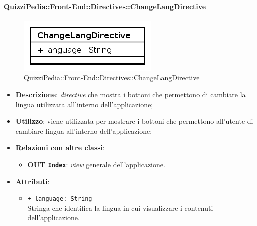 	\paragraph{QuizziPedia::Front-End::Directives::ChangeLangDirective}
		
		\label{QuizziPedia::Front-End::Directives::ChangeLangDirective}
		
		\begin{figure}[ht]
			\centering
			\includegraphics[scale=0.80,keepaspectratio]{UML/Classi/Front-End/QuizziPedia_Front-end_Directives_ChangeLangDirective.png}
			\caption{QuizziPedia::Front-End::Directives::ChangeLangDirective}
		\end{figure} \FloatBarrier
		
		\begin{itemize}
			\item \textbf{Descrizione}: \textit{directive} che mostra i bottoni che permettono di cambiare la lingua utilizzata all'interno dell'applicazione;
			\item \textbf{Utilizzo}: viene utilizzata per mostrare i bottoni che permettono all'utente di cambiare lingua all'interno dell'applicazione;
			\item \textbf{Relazioni con altre classi}: 
			\begin{itemize}
				\item \textbf{OUT \texttt{Index}}: \textit{view} generale dell'applicazione.
			\end{itemize}
			\item \textbf{Attributi}:
			\begin{itemize}
				\item \texttt{+ language: String} \\ Stringa che identifica la lingua in cui visualizzare i contenuti dell'applicazione. 
			\end{itemize}
		\end{itemize}